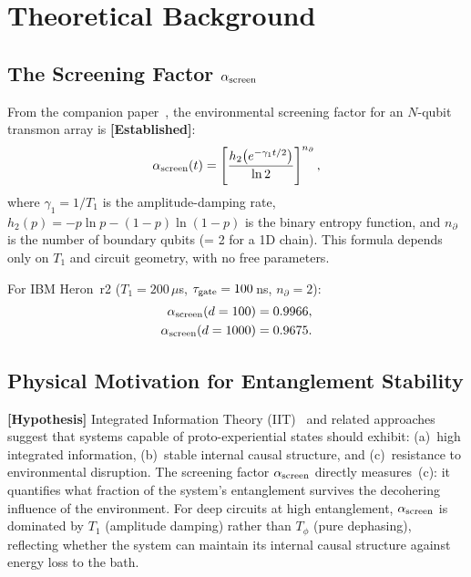 \documentclass[12pt,letterpaper]{article}
\theoremstyle{definition}
\theoremstyle{remark}
\newcommand{\established}{\textbf{[Established]}}
\newcommand{\hypothesis}{\textbf{[Hypothesis]}}
\newcommand{\ascreen}{\alpha_{\rm screen}}
\newcommand{\gammaone}{\gamma_{1}}
\newcommand{\taugate}{\tau_{\rm gate}}
\begin{document}
\section{Theoretical Background}

\subsection{The Screening Factor \texorpdfstring{$\ascreen$}{alpha\_screen}}

From the companion paper~\cite{companion}, the environmental screening factor for
an $N$-qubit transmon array is \established{}:
\begin{equation}
\ascreen(t) = \left[
  \frac{h_2\!\left(e^{-\gammaone t/2}\right)}{\ln 2}
\right]^{n_\partial},
\label{eq:alphascreen}
\end{equation}
where $\gammaone = 1/T_1$ is the amplitude-damping rate,
$h_2(p) = -p\ln p - (1-p)\ln(1-p)$ is the binary entropy function, and
$n_\partial$ is the number of boundary qubits (= 2 for a 1D chain).
This formula depends only on $T_1$ and circuit geometry, with no free parameters.

For IBM Heron~r2 ($T_1 = 200\,\mu$s, $\taugate = 100\,$ns, $n_\partial = 2$):
\begin{align}
\ascreen(d=100) &= 0.9966, \\
\ascreen(d=1000) &= 0.9675.
\end{align}

\subsection{Physical Motivation for Entanglement Stability}

\hypothesis{}
Integrated Information Theory (IIT)~\cite{tononi2008} and related approaches suggest
that systems capable of proto-experiential states should exhibit: (a)~high integrated
information, (b)~stable internal causal structure, and (c)~resistance to environmental
disruption.
The screening factor $\ascreen$ directly measures~(c): it quantifies what fraction of
the system's entanglement survives the decohering influence of the environment.
For deep circuits at high entanglement, $\ascreen$ is dominated by $T_1$ (amplitude
damping) rather than $T_\phi$ (pure dephasing), reflecting whether the system can
maintain its internal causal structure against energy loss to the bath.
\end{document}
